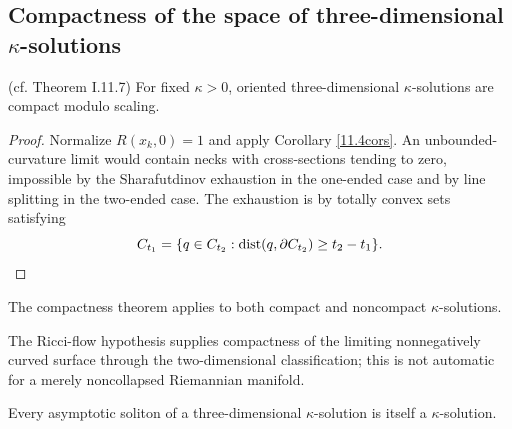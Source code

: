 \subsection{Compactness of the space of three-dimensional $\kappa$-solutions}
\label{pf11.7}
\begin{theorem}
\label{thm:kl-compactness-space-three-dimensional-solutions-compactness-kappa-solutions}

(cf. Theorem I.11.7) \label{thmI.11.7}
For fixed $\kappa>0$, oriented three-dimensional $\kappa$-solutions are
compact modulo scaling.
\end{theorem}
\begin{proof}
\sketch Normalize $R(x_k,0)=1$ and apply Corollary \ref{11.4cors}.  An
unbounded-curvature limit would contain necks with cross-sections tending to
zero, impossible by the Sharafutdinov exhaustion in the one-ended case and
by line splitting in the two-ended case.  The exhaustion is by totally convex
sets satisfying
\begin{equation}\label{C}
C_{t_1}=\{q\in C_{t_2}:\operatorname{dist}(q,\partial C_{t_2})\geq t_2-t_1\}.
\end{equation}
\end{proof}
\begin{remark}
\label{rem:kl-compactness-space-three-dimensional-solutions-compactness-kappa-solutions}

The compactness theorem applies to both compact and noncompact
$\kappa$-solutions.
\end{remark}
\begin{remark}
\label{rem:kl-compactness-space-three-dimensional-solutions-compactness-kappa-solutions-3}


The Ricci-flow hypothesis supplies compactness of the limiting
nonnegatively curved surface through the two-dimensional classification;
this is not automatic for a merely noncollapsed Riemannian manifold.
\end{remark}
\begin{corollary}
\label{cor:kl-compactness-space-three-dimensional-solutions-kappa-solutions-corollary}

Every asymptotic soliton of a three-dimensional $\kappa$-solution is itself
a $\kappa$-solution.
\end{corollary}

